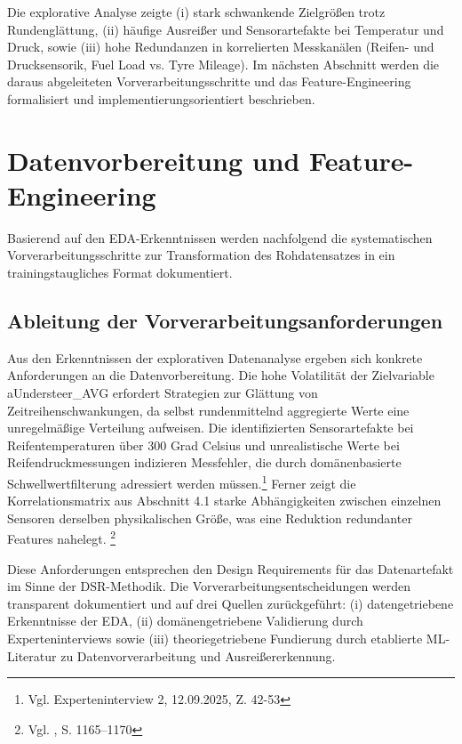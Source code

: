 Die explorative Analyse zeigte (i) stark schwankende Zielgrößen trotz Rundenglättung, (ii) häufige Ausreißer und Sensorartefakte bei Temperatur und Druck, sowie (iii) hohe Redundanzen in korrelierten Messkanälen (Reifen- und Drucksensorik, Fuel Load vs. Tyre Mileage). Im nächsten Abschnitt werden die daraus abgeleiteten Vorverarbeitungsschritte und das Feature-Engineering formalisiert und implementierungsorientiert beschrieben.



\section{Datenvorbereitung und Feature-Engineering}

Basierend auf den EDA-Erkenntnissen werden nachfolgend die systematischen Vorverarbeitungsschritte zur Transformation des Rohdatensatzes in ein trainingstaugliches Format dokumentiert.

\subsection{Ableitung der Vorverarbeitungsanforderungen}

Aus den Erkenntnissen der explorativen Datenanalyse ergeben sich konkrete Anforderungen an die Datenvorbereitung. Die hohe Volatilität der Zielvariable aUndersteer\_AVG erfordert Strategien zur Glättung von Zeitreihenschwankungen, da selbst rundenmittelnd aggregierte Werte eine unregelmäßige Verteilung aufweisen. Die identifizierten Sensorartefakte bei Reifentemperaturen über 300 Grad Celsius und unrealistische Werte bei Reifendruckmessungen indizieren Messfehler, die durch domänenbasierte Schwellwertfilterung adressiert werden müssen.\footnote{Vgl. Experteninterview 2, 12.09.2025, Z. 42-53} Ferner zeigt die Korrelationsmatrix aus Abschnitt 4.1 starke Abhängigkeiten zwischen einzelnen Sensoren derselben physikalischen Größe, was eine Reduktion redundanter Features nahelegt. \footnote{Vgl. \cite{Guyon2003}, S. 1165–1170}


Diese Anforderungen entsprechen den Design Requirements für das Datenartefakt im Sinne der DSR-Methodik. Die Vorverarbeitungsentscheidungen werden transparent dokumentiert und auf drei Quellen zurückgeführt: (i) datengetriebene Erkenntnisse der EDA, (ii) domänengetriebene Validierung durch Experteninterviews sowie (iii) theoriegetriebene Fundierung durch etablierte \ac{ML}-Literatur zu Datenvorverarbeitung und Ausreißererkennung.


